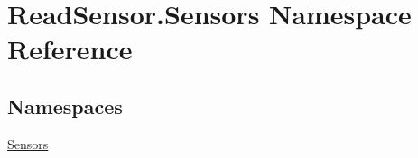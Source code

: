 \hypertarget{namespaceReadSensor_1_1Sensors}{}\section{Read\+Sensor.\+Sensors Namespace Reference}
\label{namespaceReadSensor_1_1Sensors}
\subsection*{Namespaces}
\begin{DoxyCompactItemize}
\item 
 \hyperlink{namespaceReadSensor_1_1Sensors_1_1Sensors}{Sensors}
\end{DoxyCompactItemize}
